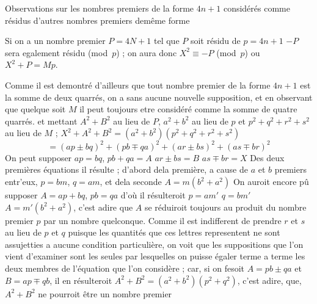 \documentclass[11pt,a4paper]{article}
\begin{document}


Observations sur les nombres premiers de la forme $4n+1$
considérés comme résidus d'autres nombres premiers demême forme

Si on a un nombre premier $P=4N+1$ tel que $P$ soit résidu de
$p=4n+1$ $-P$ sera egalement résidu (mod~$p$) ; on aura donc
$X^2\equiv -P$ (mod~$p$) ou $X^2+P=Mp$.

Comme il est demontré d'ailleurs que tout nombre premier de la forme
$4n+1$ est la somme de deux quarrés, on a sans aucune nouvelle
supposition, et en observant que quelque soit $M$ il peut toujours
etre considéré comme la somme de quatre quarrés. et mettant
$A^2+B^2$ au lieu de $P$, $a^2+b^2$ au lieu de $p$ et $p^2+q^2+r^2+s^2$ au lieu
de $M$ ; \quad $X^2+A^2+B^2=(a^2+b^2)(p^2+q^2+r^2+s^2)$
\[=(ap\pm bq)^2+(pb\mp qa)^2+(ar\pm bs)^2+(as\mp br)^2\]
On peut supposer $ap=bq$, $pb+qa=A$ \quad $ar\pm bs=B$ \quad $as\mp br=X$
Des deux premières équations il résulte ; d'abord dela première, a cause de $a$
et $b$ premiers entr'eux, $p=bm$, $q=am$, et dela seconde $A=m(b^2+a^2)$
On auroit encore pû supposer $A=ap+bq$, $pb=qa$ d'où il
résulteroit $p=am'$ \quad $q=bm'$ \quad $A=m'(b^2+a^2)$, c'est adire que
$A$ se réduiroit toujours au produit du nombre premier $p$ par un nombre
quelconque. Comme il est indifferent de prendre $r$ et $s$ au lieu de
$p$ et $q$ puisque les quantités que ces lettres representent ne sont assujetties
a aucune condition particulière, on voit que les suppositions que
l'on vient d'examiner sont les seules par lesquelles on puisse égaler
terme a terme les deux membres de l'équation que l'on considère ;
car, si on fesoit $A=pb\pm qa$ et $B=ap\mp qb$, il en résulteroit
$A^2+B^2=(a^2+b^2)(p^2+q^2)$, c'est adire, que, $A^2+B^2$ ne pourroit
être un nombre premier
\end{document}
